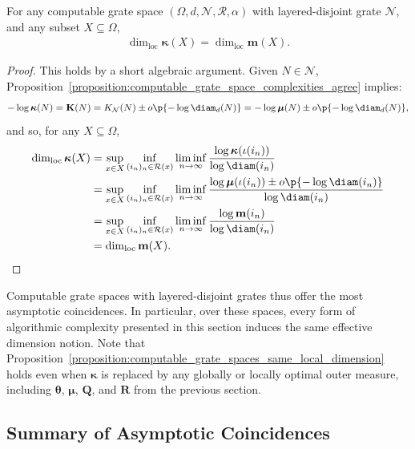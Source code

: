 \begin{proposition}
    \label{proposition:computable_grate_spaces_same_local_dimension}
    For any computable grate space $(\Omega, d, \mathcal{N}, \mathscr{R}, \alpha)$ with layered-disjoint grate $\mathcal{N}$, and any subset $X \subseteq \Omega$,
    \begin{align*}
        \dim_{\operatorname{loc}} \boldsymbol{\kappa}(X) = \dim_{\operatorname{loc}} \mathbf{m}(X).
    \end{align*}
\end{proposition}
\begin{proof}
    This holds by a short algebraic argument. Given $N \in \mathcal{N}$, Proposition~\ref{proposition:computable_grate_space_complexities_agree} implies:
    \begin{align*}
        - \log \boldsymbol{\kappa}(N) = \mathbf{K}(N) = K_{\mathcal{N}}(N) \pm o\p{- \log \diam_d(N)} = - \log \boldsymbol{\mu}(N) \pm o\p{- \log \diam_d(N)},
    \end{align*}
    and so, for any $X \subseteq \Omega$,
    \begin{align*}
        \dim_{\operatorname{loc}} \boldsymbol{\kappa}(X) &= \sup_{x \in X} \inf_{(i_n)_n \in \mathcal{R}(x)} \liminf_{n \to \infty} \frac{\log \boldsymbol{\kappa}(\iota(i_n))}{\log \diam(i_n)}\\
        &= \sup_{x \in X} \inf_{(i_n)_n \in \mathcal{R}(x)} \liminf_{n \to \infty} \frac{\log \boldsymbol{\mu}(\iota(i_n)) \pm o\p{- \log \diam(i_n)}}{\log \diam(i_n)}\\
        &= \sup_{x \in X} \inf_{(i_n)_n \in \mathcal{R}(x)} \liminf_{n \to \infty} \frac{\log \mathbf{m}(i_n)}{\log \diam(i_n)}\\
        &= \dim_{\operatorname{loc}} \mathbf{m}(X).
    \end{align*}
\end{proof}

Computable grate spaces with layered-disjoint grates thus offer the most asymptotic coincidences. In particular, over these spaces, every form of algorithmic complexity presented in this section induces the same effective dimension notion. Note that Proposition~\ref{proposition:computable_grate_spaces_same_local_dimension} holds even when $\boldsymbol{\kappa}$ is replaced by any globally or locally optimal outer measure, including $\boldsymbol{\theta}$, $\boldsymbol{\mu}$, $\mathbf{Q}$, and $\mathbf{R}$ from the previous section.

\subsection{Summary of Asymptotic Coincidences}

